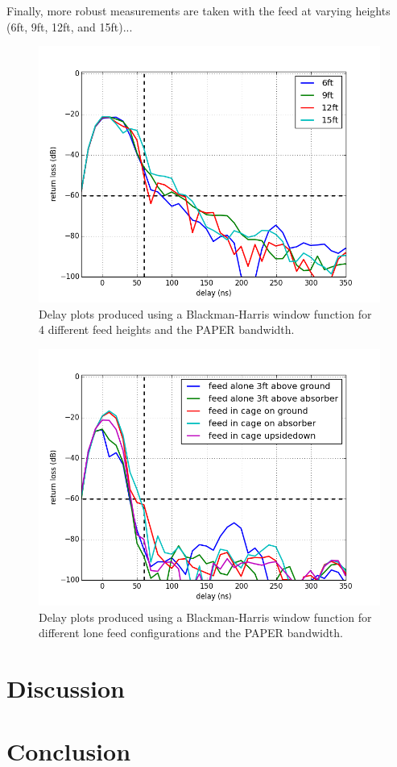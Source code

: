 \documentclass[12pt,preprint]{aastex}
\begin{document}
Finally, more robust measurements are taken with the feed at varying heights (6ft, 9ft, 12ft, and 15ft)...

\begin{figure}
\centering
\includegraphics[totalheight=0.5\textheight]{plots/delay_heights_paper.png}
\caption{Delay plots produced using a Blackman-Harris window function for 4 different feed heights and the PAPER bandwidth.}
\end{figure}

\begin{figure}
\centering
\includegraphics[totalheight=0.5\textheight]{plots/delay_feed.png}
\caption{Delay plots produced using a Blackman-Harris window function for different lone feed configurations and the PAPER bandwidth.}
\end{figure}


\section{Discussion}

\section{Conclusion}
\end{document}
